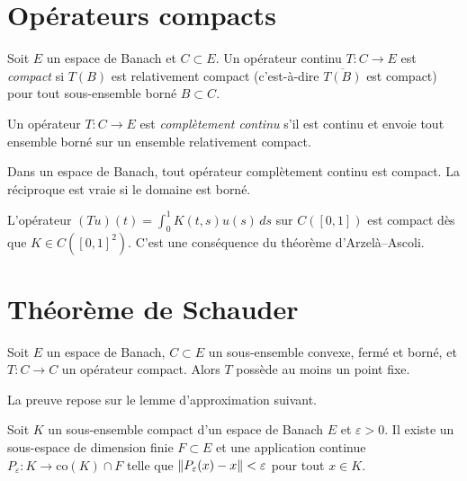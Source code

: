 \section{Op\'erateurs compacts}

\begin{definition}
Soit $E$ un espace de Banach et $C \subset E$. Un op\'erateur continu
$T : C \to E$ est \emph{compact} si $T(B)$ est relativement compact (c'est-\`a-dire
$\overline{T(B)}$ est compact) pour tout sous-ensemble born\'e $B \subset C$.
\end{definition}

\begin{definition}
Un op\'erateur $T : C \to E$ est \emph{compl\`etement continu} s'il est continu et
envoie tout ensemble born\'e sur un ensemble relativement compact.
\end{definition}

\begin{remarque}
Dans un espace de Banach, tout op\'erateur compl\`etement continu est compact. La
r\'eciproque est vraie si le domaine est born\'e.
\end{remarque}

\begin{exemple}
L'op\'erateur $(Tu)(t) = \int_0^1 K(t,s) u(s) \, ds$ sur $C([0,1])$ est compact
d\`es que $K \in C([0,1]^2)$. C'est une cons\'equence du th\'eor\`eme d'Arzel\`a--Ascoli.
\end{exemple}

\section{Th\'eor\`eme de Schauder}

\begin{theoreme}[Schauder, 1930]\label{thm:schauder}
Soit $E$ un espace de Banach, $C \subset E$ un sous-ensemble convexe, ferm\'e et
born\'e, et $T : C \to C$ un op\'erateur compact. Alors $T$ poss\`ede au moins un
point fixe.
\end{theoreme}

La preuve repose sur le lemme d'approximation suivant.

\begin{lemme}\label{lem:schauder-approx}
Soit $K$ un sous-ensemble compact d'un espace de Banach $E$ et $\varepsilon > 0$.
Il existe un sous-espace de dimension finie $F \subset E$ et une application
continue $P_\varepsilon : K \to \mathrm{co}(K) \cap F$ telle que
$\left\| P_\varepsilon(x) - x \right\| < \varepsilon$ pour tout $x \in K$.
\end{lemme}

